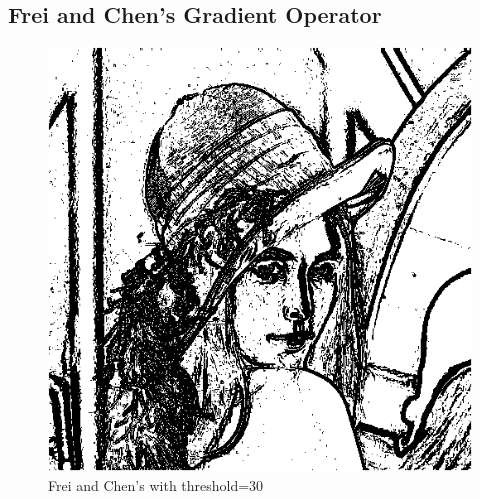 \documentclass{article}
\begin{document}
\subsection{Frei and Chen's Gradient Operator}
\begin{figure}[H]
  \includegraphics[width=\linewidth]{img/frei_and_chen_30.png}
  \caption{Frei and Chen's with threshold=30}
  \label{fig:frei_and_chen_30}
\end{figure}
\end{document}
